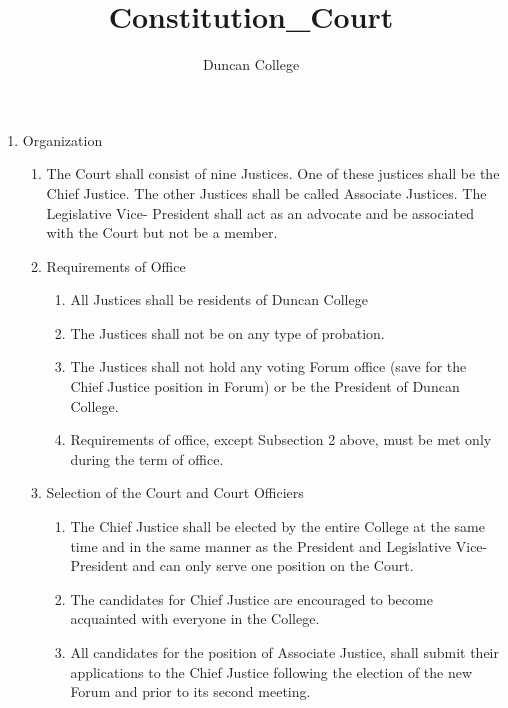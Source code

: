 \documentclass[11pt]{amsart}
\title{Constitution\_Court}
\author{Duncan College}
\begin{document}
\maketitle

\begin{enumerate}
\item Organization
	\begin{enumerate}
		\item The Court shall consist of nine Justices. One of these justices shall be the Chief Justice. The other Justices shall be called Associate Justices. The Legislative Vice- President shall act as an advocate and be associated with the Court but not be a member.
			\item Requirements of Office
			\begin{enumerate}
			\item All Justices shall be residents of Duncan College
			\item The Justices shall not be on any type of probation.
			\item The Justices shall not hold any voting Forum office (save for the Chief Justice position in Forum) or be the President of Duncan College.
			\item Requirements of office, except Subsection 2 above, must be met only during the term of office.
			\end{enumerate}
		\item Selection of the Court and Court Officiers
			\begin{enumerate}
			\item The Chief Justice shall be elected by the entire College at the same time and in the same manner as the President and Legislative Vice-President and can only serve one position on the Court.
			\item The candidates for Chief Justice are encouraged to become acquainted with everyone in the College.
			\item All candidates for the position of Associate Justice, shall submit their applications to the Chief Justice following the election of the new Forum and prior to its second meeting.

\end{enumerate}
\end{enumerate}
\end{enumerate}
\end{document}
